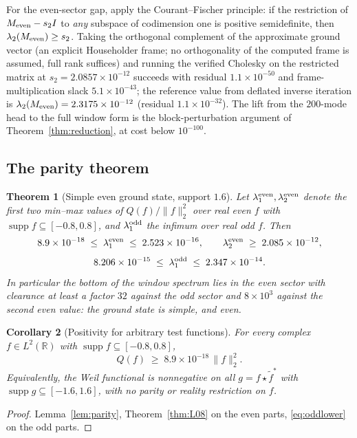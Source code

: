 ﻿\documentclass[11pt]{article}
\newtheorem{theorem}{Theorem}[section]
\newtheorem{corollary}[theorem]{Corollary}
\newcommand{\R}{\mathbb{R}}
\newcommand{\supp}{\operatorname{supp}}
\begin{document}
For the even-sector gap, apply the Courant--Fischer principle: if the
restriction of $M_{\rm even}-s_2I$ to \emph{any} subspace of
codimension one is positive semidefinite, then
$\lambda_2(M_{\rm even})\ge s_2$.  Taking the orthogonal complement of
the approximate ground vector (an explicit Householder frame; no
orthogonality of the computed frame is assumed, full rank suffices)
and running the verified Cholesky on the restricted matrix at
$s_2=2.0857\times10^{-12}$ succeeds with residual $1.1\times10^{-50}$
and frame-multiplication slack $5.1\times10^{-43}$; the reference
value from deflated inverse iteration is
$\lambda_2(M_{\rm even})=2.3175\times10^{-12}$ (residual
$1.1\times10^{-32}$).  The lift from the $200$-mode head to the full
window form is the block-perturbation argument of
Theorem~\ref{thm:reduction}, at cost below $10^{-100}$.

\subsection{The parity theorem}

\begin{theorem}[Simple even ground state, support $1.6$]
\label{thm:parity}
Let $\lambda_1^{\rm even},\lambda_2^{\rm even}$ denote the first two
min--max values of $Q(f)/\|f\|_2^2$ over real even $f$ with
$\supp f\subseteq[-0.8,0.8]$, and $\lambda_1^{\rm odd}$ the infimum
over real odd $f$.  Then
\[
8.9\times10^{-18}\;\le\;\lambda_1^{\rm even}\;\le\;2.523\times10^{-16},
\qquad
\lambda_2^{\rm even}\;\ge\;2.085\times10^{-12},
\]
\[
8.206\times10^{-15}\;\le\;\lambda_1^{\rm odd}\;\le\;2.347\times10^{-14}.
\]
In particular the bottom of the window spectrum lies in the even
sector with clearance at least a factor $32$ against the odd sector
and $8\times10^{3}$ against the second even value: the ground state
is simple, and even.
\end{theorem}

\begin{corollary}[Positivity for arbitrary test functions]
\label{cor:allf}
For every complex $f\in L^2(\R)$ with $\supp f\subseteq[-0.8,0.8]$,
\[
Q(f)\;\ge\;8.9\times10^{-18}\,\|f\|_2^2 .
\]
Equivalently, the Weil functional is nonnegative on all
$g=f\star\tilde f^*$ with $\supp g\subseteq[-1.6,1.6]$, with no parity
or reality restriction on $f$.
\end{corollary}

\begin{proof}
Lemma~\ref{lem:parity}, Theorem~\ref{thm:L08} on the even parts,
\eqref{eq:oddlower} on the odd parts.
\end{proof}
\end{document}
